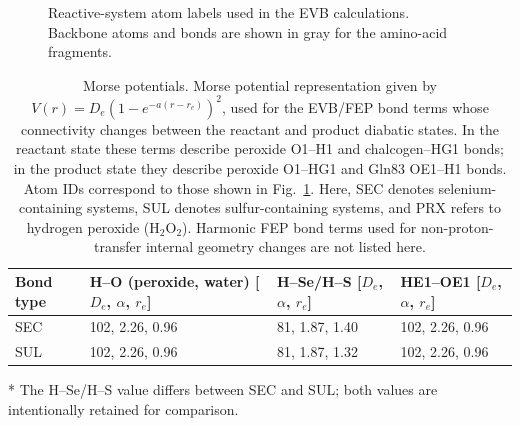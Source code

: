 \documentclass[journal=jpcbfk,manuscript=suppinfo]{achemso}
\begin{document}
\begin{figure}
\caption[Reactive-system atom labels]{Reactive-system atom labels used in the EVB calculations. Backbone atoms and bonds are shown in gray for the amino-acid fragments.}
\label{fig:atoms}
\end{figure}

\begin{table}[H]
\centering
\caption[Morse potentials]{Morse potentials. {\normalfont
Morse potential representation given by $V(r) = D_e\left(1 - e^{-a(r-r_e)}\right)^2$,
used for the EVB/FEP bond terms whose connectivity changes between the reactant and product diabatic states. In the reactant state these terms describe peroxide O1--H1 and chalcogen--HG1 bonds; in the product state they describe peroxide O1--HG1 and Gln83 OE1--H1 bonds. Atom IDs correspond to those shown in Fig.~\ref{fig:atoms}.
Here, SEC denotes selenium-containing systems, SUL denotes sulfur-containing systems,
and PRX refers to hydrogen peroxide ($\mathrm{H_2O_2}$). Harmonic FEP bond terms used for non-proton-transfer internal geometry changes are not listed here.}}
\begin{threeparttable}
\begin{tabularx}{\textwidth}{lXXX}
\toprule
\textbf{Bond type} &
\makecell{\textbf{H--O (peroxide,} \\ \textbf{water) [$D_e$, $\alpha$, $r_e$]}} &
\makecell{\textbf{H--Se/H--S} \\ \textbf{[$D_e$, $\alpha$, $r_e$]}} &
\makecell{\textbf{HE1--OE1} \\ \textbf{[$D_e$, $\alpha$, $r_e$]}} \\
\midrule
SEC & 102, 2.26, 0.96 & 81, 1.87, 1.40\tnote{*} & 102, 2.26, 0.96 \\
SUL & 102, 2.26, 0.96 & 81, 1.87, 1.32\tnote{*} & 102, 2.26, 0.96 \\
\bottomrule
\end{tabularx}
\begin{tablenotes}
\item[*] The H--Se/H--S value differs between SEC and SUL; both values are intentionally retained for comparison.
\end{tablenotes}
\end{threeparttable}
\label{tab:morse}
\end{table}
    
\end{document}
